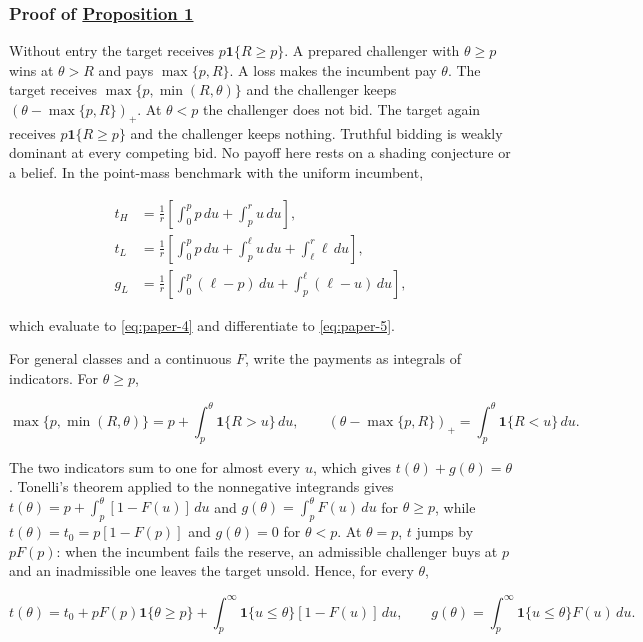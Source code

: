 \subsubsection{\texorpdfstring{Proof of
\hyperref[result-proposition-1]{Proposition
1}}{Proof of Proposition 1}}\label{proof-of-proposition-1}

Without entry the target receives \(p\mathbf1\{R\ge p\}\). A prepared
challenger with \(\theta\ge p\) wins at \(\theta>R\) and pays
\(\max\{p,R\}\). A loss makes the incumbent pay \(\theta\). The target
receives \(\max\{p,\min(R,\theta)\}\) and the challenger keeps
\((\theta-\max\{p,R\})_+\). At \(\theta<p\) the challenger does not
bid. The target again receives \(p\mathbf1\{R\ge p\}\) and the
challenger keeps nothing. Truthful bidding is weakly dominant at
every competing bid. No payoff here rests on a shading conjecture or
a belief. In the point-mass benchmark with the uniform incumbent,

\[
\begin{aligned}
t_H&=\frac1r\left[\int_0^p p\,du+\int_p^r u\,du\right],\\
t_L&=\frac1r\left[\int_0^p p\,du+\int_p^\ell u\,du+\int_\ell^r\ell\,du\right],\\
g_L&=\frac1r\left[\int_0^p(\ell-p)\,du+\int_p^\ell(\ell-u)\,du\right],
\end{aligned}
\tag{A.1}\label{eq:paper-a-1}
\]

which evaluate to \eqref{eq:paper-4} and differentiate to
\eqref{eq:paper-5}.

For general classes and a continuous \(F\), write the payments as
integrals of indicators. For \(\theta\ge p\),

\[
\max\{p,\min(R,\theta)\}=p+\int_p^\theta\mathbf1\{R>u\}\,du,
\qquad
(\theta-\max\{p,R\})_+=\int_p^\theta\mathbf1\{R<u\}\,du.
\tag{A.2}\label{eq:paper-a-2}
\]

The two indicators sum to one for almost every \(u\), which gives
\(t(\theta)+g(\theta)=\theta\). Tonelli's theorem applied to the
nonnegative integrands gives
\(t(\theta)=p+\int_p^\theta[1-F(u)]\,du\) and
\(g(\theta)=\int_p^\theta F(u)\,du\) for \(\theta\ge p\), while
\(t(\theta)=t_0=p[1-F(p)]\) and \(g(\theta)=0\) for \(\theta<p\). At
\(\theta=p\), \(t\) jumps by \(pF(p)\): when the incumbent fails the
reserve, an admissible challenger buys at \(p\) and an inadmissible one
leaves the target unsold. Hence, for every \(\theta\),

\[
t(\theta)=t_0+pF(p)\mathbf1\{\theta\ge p\}
+\int_p^\infty\mathbf1\{u\le\theta\}[1-F(u)]\,du,\qquad
g(\theta)=\int_p^\infty\mathbf1\{u\le\theta\}F(u)\,du .
\]

